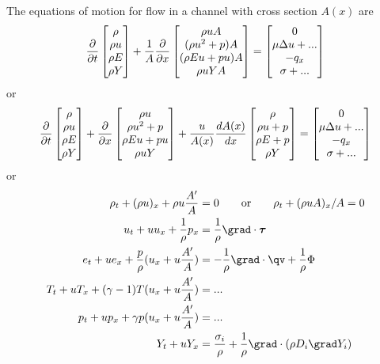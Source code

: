 \documentclass{article}
\begin{document}
The equations of motion for flow in a channel with cross section $A(x)$ are
\begin{align}
{\partial \over \partial t} \begin{bmatrix} \rho \\ \rho u \\ \rho E \\ \rho Y \end{bmatrix}
+{1\over A} {\partial \over \partial x} 
\begin{bmatrix} \rho u A \\ (\rho u^2 + p)A  \\ (\rho E u + p u)A  \\ \rho u Y A \end{bmatrix}
= \begin{bmatrix} 0 \\ \mu \Delta u + ...  \\ -q_x  \\ \sigma + ... \end{bmatrix}
\end{align}
or 
\begin{align}
{\partial \over \partial t} \begin{bmatrix} \rho \\ \rho u \\ \rho E \\ \rho Y \end{bmatrix}
+{\partial \over \partial x} \begin{bmatrix} \rho u \\ \rho u^2 + p  \\ \rho E u + p u  \\ \rho u Y \end{bmatrix}
+{u\over A(x)} {d A(x) \over d x} \begin{bmatrix} \rho \\ \rho u  + p  \\ \rho E + p  \\ \rho  Y \end{bmatrix}
= \begin{bmatrix} 0 \\ \mu \Delta u + ...  \\ -q_x  \\ \sigma + ... \end{bmatrix}
\end{align}
or 
\begin{align}
   \rho_t + (\rho u)_x  + \rho u {A' \over A}&=0 \qquad\mbox{or}\qquad \rho_t+(\rho u A)_x/A =0\\
   u_t  + u u_x +{1\over\rho} p_x &= {1\over\rho}\grad\cdot\tauv \\
   e_t  + u e_x + {p\over\rho} ( u_x + u {A' \over A})
           &= -{1\over\rho} \grad\cdot\qv  + {1\over\rho}\Phi    \\
   T_t  + u T_x + (\gamma-1) T ( u_x + u {A' \over A})
           &= ...    \\
   p_t  + u p_x + \gamma p ( u_x + u {A' \over A})
           &= ...    \\
   Y_t + u Y_x &= {\sigma_i \over \rho} +{1\over\rho}\grad\cdot(\rho D_i\grad Y_i) 
\end{align}
\end{document}
